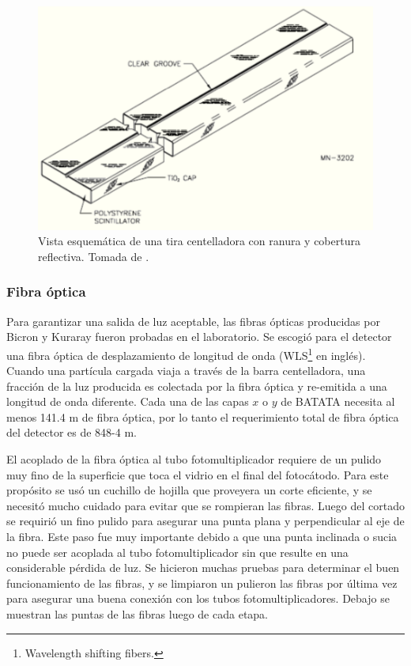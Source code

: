 \documentclass[a4paper,10pt]{article}
\numberwithin{equation}{section}
\begin{document}
\begin{figure}[H]
 \center 
 \includegraphics[scale=0.5]{fig3}
 \caption{Vista esquemática de una tira centelladora con ranura y cobertura 
 reflectiva. Tomada de \cite{trovato}.}
\end{figure}

\subsubsection{Fibra óptica}

Para garantizar una salida de luz aceptable, las fibras ópticas producidas por 
Bicron y Kuraray fueron probadas en el laboratorio. Se escogió para el detector 
una fibra óptica de desplazamiento de longitud de onda (WLS\footnote{Wavelength 
shifting fibers.} en inglés). Cuando una partícula cargada viaja a través de la 
barra centelladora, una fracción de la luz producida es colectada por la fibra 
óptica y re-emitida a una longitud de onda diferente. Cada una de las capas $x$ 
o $y$ de BATATA necesita al menos 141.4 m de fibra óptica, por lo tanto el requerimiento 
total de fibra óptica del detector es de 848-4 m.

\vspace{.3cm}

El acoplado de la fibra óptica al tubo fotomultiplicador requiere de un pulido 
muy fino de la superficie que toca el vidrio en el final del fotocátodo. Para este 
propósito se usó un cuchillo de hojilla que proveyera un corte eficiente, y se necesitó 
mucho cuidado para evitar que se rompieran las fibras. Luego del cortado se 
requirió un fino pulido para asegurar una punta plana y perpendicular al eje de 
la fibra. Este paso fue muy importante debido a que una punta inclinada o sucia 
no puede ser acoplada al tubo fotomultiplicador sin que resulte en una considerable 
pérdida de luz. Se hicieron muchas pruebas para determinar el buen funcionamiento de 
las fibras, y se limpiaron un pulieron las fibras por última vez para asegurar una 
buena conexión con los tubos fotomultiplicadores. Debajo se muestran las puntas de 
las fibras luego de cada etapa. 
\end{document}
